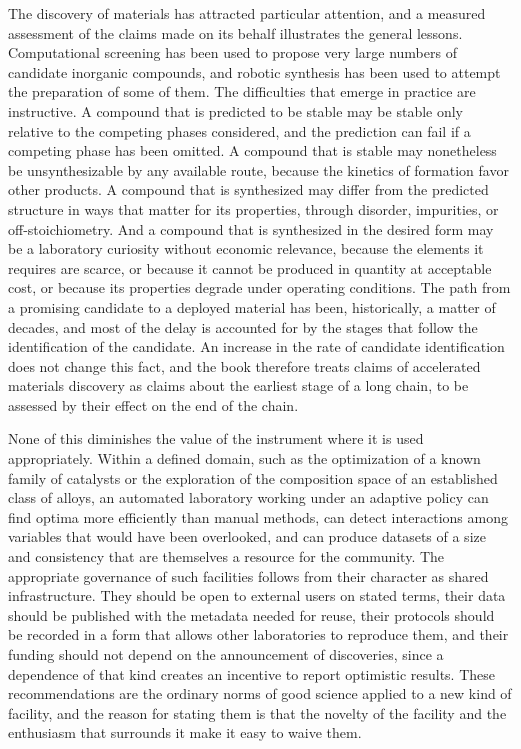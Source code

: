 The discovery of materials has attracted particular attention, and a measured assessment of the claims made on its behalf illustrates the general lessons. Computational screening has been used to propose very large numbers of candidate inorganic compounds, and robotic synthesis has been used to attempt the preparation of some of them. The difficulties that emerge in practice are instructive. A compound that is predicted to be stable may be stable only relative to the competing phases considered, and the prediction can fail if a competing phase has been omitted. A compound that is stable may nonetheless be unsynthesizable by any available route, because the kinetics of formation favor other products. A compound that is synthesized may differ from the predicted structure in ways that matter for its properties, through disorder, impurities, or off-stoichiometry. And a compound that is synthesized in the desired form may be a laboratory curiosity without economic relevance, because the elements it requires are scarce, or because it cannot be produced in quantity at acceptable cost, or because its properties degrade under operating conditions. The path from a promising candidate to a deployed material has been, historically, a matter of decades, and most of the delay is accounted for by the stages that follow the identification of the candidate. An increase in the rate of candidate identification does not change this fact, and the book therefore treats claims of accelerated materials discovery as claims about the earliest stage of a long chain, to be assessed by their effect on the end of the chain.

None of this diminishes the value of the instrument where it is used appropriately. Within a defined domain, such as the optimization of a known family of catalysts or the exploration of the composition space of an established class of alloys, an automated laboratory working under an adaptive policy can find optima more efficiently than manual methods, can detect interactions among variables that would have been overlooked, and can produce datasets of a size and consistency that are themselves a resource for the community. The appropriate governance of such facilities follows from their character as shared infrastructure. They should be open to external users on stated terms, their data should be published with the metadata needed for reuse, their protocols should be recorded in a form that allows other laboratories to reproduce them, and their funding should not depend on the announcement of discoveries, since a dependence of that kind creates an incentive to report optimistic results. These recommendations are the ordinary norms of good science applied to a new kind of facility, and the reason for stating them is that the novelty of the facility and the enthusiasm that surrounds it make it easy to waive them.

